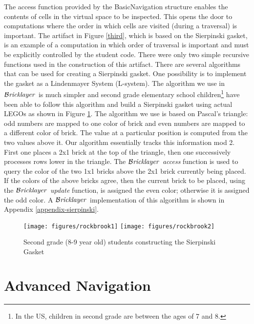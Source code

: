 \documentclass[submission,copyright,creativecommons]{eptcs}
\newcommand{\bricklayer}{\ensuremath{\mathcal{B}\emph{ricklayer}}}
\begin{document}
The access function provided by the BasicNavigation structure enables the contents of cells in the virtual space to be inspected. This opens the door to computations where the order in which cells are visited (during a traversal) is important. The artifact in Figure \ref{third}, which is based on the Sierpinski gasket, is an example of a computation in which order of traversal is important and must be explicitly controlled by the student code. There were only two simple recursive functions used in the construction of this artifact. There are several algorithms that can be used for creating a Sierpinski gasket. One possibility is to implement the gasket as a Lindenmayer System (L-system). The algorithm we use in \bricklayer\ is much simpler and second grade elementary school children\footnote{In the US, children in second grade are between the ages of 7 and 8.} have been able to follow this algorithm and build a Sierpinski gasket using actual LEGOs as shown in Figure \ref{fig-sierpinski-lego}. The algorithm we use is based on Pascal's triangle: odd numbers are mapped to one color of brick and even numbers are mapped to a different color of brick. The value at a particular position is computed from the two values above it. Our algorithm essentially tracks this information mod 2. First one places a 2x1 brick at the top of the triangle, then one successively processes rows lower in the triangle. The \bricklayer\ \emph{access} function is used to query the color of the two 1x1 bricks above the 2x1 brick currently being placed. If the colors of the above bricks agree, then the current brick to be placed, using the \bricklayer\ \emph{update} function, is assigned the even color; otherwise it is assigned the odd color. A \bricklayer\ implementation of this algorithm is shown in Appendix \ref{appendix-sierpinski}.


\begin{figure}[htb!]
\centering
\texttt{[image: figures/rockbrook1]}
\texttt{[image: figures/rockbrook2]}

\caption{Second grade (8-9 year old) students constructing the Sierpinski Gasket}\label{fig-sierpinski-lego}
\end{figure}


\section{Advanced Navigation}\label{section-advanced-navigation}
\end{document}
